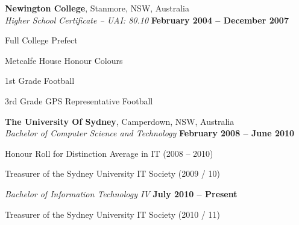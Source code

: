 \documentclass[margin,line]{resume}
\begin{document}
\begin{resume}
    \textbf{Newington College}, Stanmore, NSW, Australia \vspace{2mm}\\\vspace{1mm}%
    \textsl{Higher School Certificate -- UAI: 80.10} \hfill \textbf{February 2004 -- December 2007}\vspace{-3mm}\\\vspace{-1mm}%
    \begin{list2}
        \item Full College Prefect 
        \item Metcalfe House Honour Colours
	\item 1st Grade Football
	\item 3rd Grade GPS Representative Football 
    \end{list2}\vspace{-1.5mm}
    \textbf{The University Of Sydney}, Camperdown, NSW, Australia \vspace{2mm}\\\vspace{1mm}%
    \textsl{Bachelor of Computer Science and Technology} \hfill \textbf{February 2008 -- June 2010}\vspace{-3mm}\\\vspace{-1mm}%
     \begin{list2}
        \item Honour Roll for Distinction Average in IT (2008 -- 2010) 
        \item Treasurer of the Sydney University IT Society (2009 / 10)
     \end{list2}\vspace{-1.5mm}
    \textsl{Bachelor of Information Technology IV} \hfill \textbf{July 2010 -- Present}\vspace{-3mm}\\\vspace{-1mm}%
     \begin{list2}
        \item Treasurer of the Sydney University IT Society (2010 / 11)
     \end{list2}\vspace{-1.5mm}




\end{resume}
\end{document}
